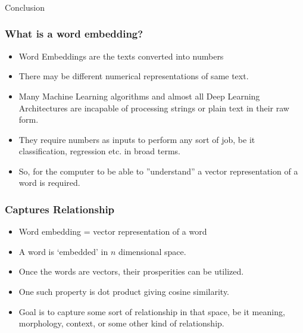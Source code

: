 \begin{frame}[fragile]\frametitle{}

\begin{center}
{\Large Conclusion}
\end{center}
\end{frame}


\begin{frame}[fragile]\frametitle{What is a word embedding?}
\begin{itemize}
\item Word Embeddings are the texts converted into numbers
\item There may be different numerical representations of  same text. 
\item Many Machine Learning algorithms and almost all Deep Learning Architectures are incapable of processing strings or plain text in their raw form. 
\item They require numbers as inputs to perform any sort of job, be it classification, regression etc. in broad terms.
\item So, for the computer to be able to ''understand'' a vector representation of a word is required.
\end{itemize}
\end{frame}


\begin{frame}[fragile]\frametitle{Captures Relationship}
  \begin{itemize}
    \item Word embedding = vector representation of a word
	\item A word is `embedded' in $n$ dimensional space.
	\item Once the words are vectors, their prosperities can be utilized.
	\item One such property is dot product giving cosine similarity.
	\item Goal is to capture some sort of relationship in that space, be it meaning, morphology, context, or some other kind of relationship.
  \end{itemize}


\end{frame}


